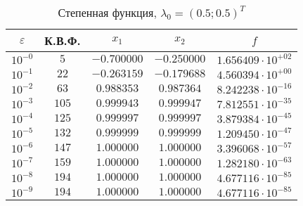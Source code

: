 \documentclass[a4paper,12pt,notitlepage,pdftex,headsepline]{scrartcl}
\begin{document}
        \begin{table}[ht]
          \centering
          \caption{Степенная функция, $\lambda_0 = (0.5; 0.5)^T$}
          \begin{tabular}{|c|c|c|c|c|}
            \hline
            $\varepsilon$ & К.В.Ф. & $x_1$ & $x_2$ & $f$\\
            \hline
            $10^{-0}$ & $5$ & $-0.700000$ & $-0.250000$ & $1.656409\cdot 10^{+02}$\\
            $10^{-1}$ & $22$ & $-0.263159$ & $-0.179688$ & $4.560394\cdot 10^{+00}$\\
            $10^{-2}$ & $63$ & $0.988353$ & $0.987364$ & $8.242238\cdot 10^{-16}$\\
            $10^{-3}$ & $105$ & $0.999943$ & $0.999947$ & $7.812551\cdot 10^{-35}$\\
            $10^{-4}$ & $125$ & $0.999997$ & $0.999997$ & $3.879384\cdot 10^{-45}$\\
            $10^{-5}$ & $132$ & $0.999999$ & $0.999999$ & $1.209450\cdot 10^{-47}$\\
            $10^{-6}$ & $147$ & $1.000000$ & $1.000000$ & $3.396068\cdot 10^{-57}$\\
            $10^{-7}$ & $159$ & $1.000000$ & $1.000000$ & $1.282180\cdot 10^{-63}$\\
            $10^{-8}$ & $194$ & $1.000000$ & $1.000000$ & $4.677116\cdot 10^{-85}$\\
            $10^{-9}$ & $194$ & $1.000000$ & $1.000000$ & $4.677116\cdot 10^{-85}$\\
            \hline
          \end{tabular}
        \end{table}
\end{document}
